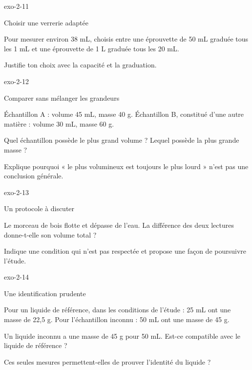 \documentclass[12pt,twoside,openany]{book}
\begin{document}
\begin{blocLivre}{exo-2-11}
\begin{exercice}[2]{Choisir une verrerie adaptée}
\begin{questions}
\item Pour mesurer environ 38 mL, choisis entre une éprouvette de 50 mL graduée tous les 1 mL et une éprouvette de 1 L graduée tous les 20 mL.
\item Justifie ton choix avec la capacité et la graduation.
\end{questions}
\end{exercice}\end{blocLivre}
\begin{blocLivre}{exo-2-12}
\begin{exercice}[3]{Comparer sans mélanger les grandeurs}
\begin{donnees}Échantillon A : volume 45 mL, masse 40 g. Échantillon B, constitué d’une autre matière : volume 30 mL, masse 60 g.\par
\end{donnees}
\begin{questions}
\item Quel échantillon possède le plus grand volume ? Lequel possède la plus grande masse ?
\item Explique pourquoi « le plus volumineux est toujours le plus lourd » n’est pas une conclusion générale.
\end{questions}
\end{exercice}\end{blocLivre}
\begin{blocLivre}{exo-2-13}
\begin{exercice}[3]{Un protocole à discuter}
\begin{questions}
\item Le morceau de bois flotte et dépasse de l’eau. La différence des deux lectures donne-t-elle son volume total ?
\item Indique une condition qui n’est pas respectée et propose une façon de poursuivre l’étude.
\end{questions}
\end{exercice}\end{blocLivre}
\begin{blocLivre}{exo-2-14}
\begin{exercice}[3]{Une identification prudente}
\begin{donnees}Pour un liquide de référence, dans les conditions de l’étude : 25 mL ont une masse de 22,5 g. Pour l’échantillon inconnu : 50 mL ont une masse de 45 g.\par
\end{donnees}
\begin{questions}
\item Un liquide inconnu a une masse de 45 g pour 50 mL. Est-ce compatible avec le liquide de référence ?
\item Ces seules mesures permettent-elles de prouver l’identité du liquide ?
\end{questions}
\end{exercice}\end{blocLivre}
\end{document}
